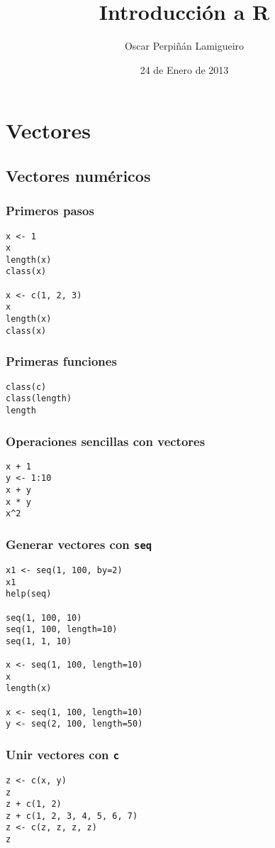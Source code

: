 \documentclass[bigger]{beamer}
\title{Introducción a R}
\author{Oscar Perpiñán Lamigueiro}
\date{24 de Enero de 2013}
\begin{document}
\maketitle



\section{Vectores}
\label{sec-1}
\subsection{Vectores numéricos}
\label{sec-1-1}
\begin{frame}[fragile]
\frametitle{Primeros pasos}
\label{sec-1-1-1}


\lstset{language=R}
\begin{lstlisting}
x <- 1
x
length(x)
class(x)

x <- c(1, 2, 3)
x
length(x)
class(x)
\end{lstlisting}
\end{frame}
\begin{frame}[fragile]
\frametitle{Primeras funciones}
\label{sec-1-1-2}


\lstset{language=R}
\begin{lstlisting}
class(c)
class(length)
length
\end{lstlisting}
\end{frame}
\begin{frame}[fragile]
\frametitle{Operaciones sencillas con vectores}
\label{sec-1-1-3}


\lstset{language=R}
\begin{lstlisting}
x + 1
y <- 1:10
x + y
x * y
x^2
\end{lstlisting}
\end{frame}
\begin{frame}[fragile]
\frametitle{Generar vectores con \texttt{seq}}
\label{sec-1-1-4}


\lstset{language=R}
\begin{lstlisting}
x1 <- seq(1, 100, by=2)
x1
help(seq)

seq(1, 100, 10)
seq(1, 100, length=10)
seq(1, 1, 10)

x <- seq(1, 100, length=10)
x
length(x)

x <- seq(1, 100, length=10)
y <- seq(2, 100, length=50)
\end{lstlisting}
\end{frame}
\begin{frame}[fragile]
\frametitle{Unir vectores con \texttt{c}}
\label{sec-1-1-5}


\lstset{language=R}
\begin{lstlisting}
z <- c(x, y)
z
z + c(1, 2)
z + c(1, 2, 3, 4, 5, 6, 7)
z <- c(z, z, z, z)
z
\end{lstlisting}
\end{frame}
\end{document}
